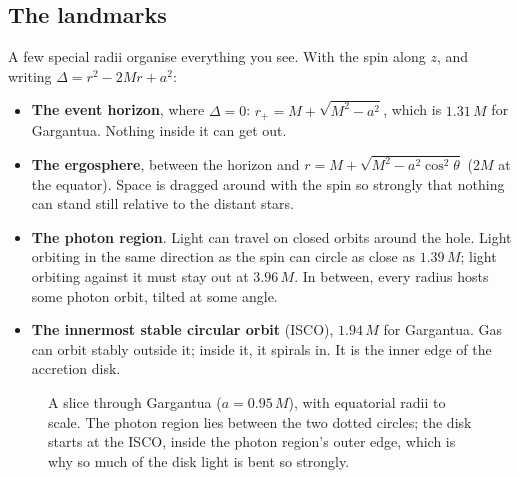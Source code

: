 \documentclass[11pt,a4paper]{article}
\begin{document}
\subsection{The landmarks}

A few special radii organise everything you see. With the spin along $z$, and writing
$\Delta = r^2 - 2Mr + a^2$:
\begin{itemize}
  \item \textbf{The event horizon}, where $\Delta = 0$:
        $r_+ = M + \sqrt{M^2 - a^2}$, which is $1.31\,M$ for Gargantua. Nothing inside it
        can get out.
  \item \textbf{The ergosphere}, between the horizon and $r = M + \sqrt{M^2 - a^2\cos^2\theta}$
        ($2M$ at the equator). Space is dragged around with the spin so strongly that
        nothing can stand still relative to the distant stars.
  \item \textbf{The photon region}. Light can travel on closed orbits around the hole.
        Light orbiting in the same direction as the spin can circle as close as $1.39\,M$;
        light orbiting against it must stay out at $3.96\,M$. In between, every radius
        hosts some photon orbit, tilted at some angle.
  \item \textbf{The innermost stable circular orbit} (ISCO), $1.94\,M$ for Gargantua.
        Gas can orbit stably outside it; inside it, it spirals in. It is the inner edge of
        the accretion disk.
\end{itemize}

\begin{figure}[h]
\centering
{}
\caption{A slice through Gargantua ($a = 0.95\,M$), with equatorial radii to scale. The photon region lies
between the two dotted circles; the disk starts at the ISCO, inside the photon region's
outer edge, which is why so much of the disk light is bent so strongly.}
\end{figure}
\end{document}

